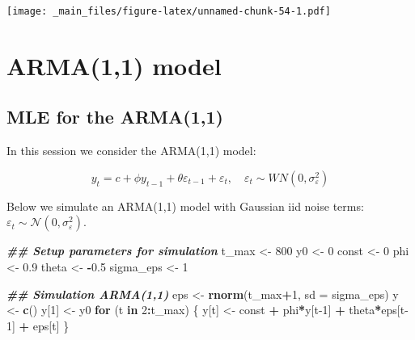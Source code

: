 \documentclass[
]{book}
\newenvironment{Shaded}{\begin{snugshade}}{\end{snugshade}}
\newcommand{\AttributeTok}[1]{\textcolor[rgb]{0.13,0.29,0.53}{#1}}
\newcommand{\ControlFlowTok}[1]{\textcolor[rgb]{0.13,0.29,0.53}{\textbf{#1}}}
\newcommand{\DecValTok}[1]{\textcolor[rgb]{0.00,0.00,0.81}{#1}}
\newcommand{\DocumentationTok}[1]{\textcolor[rgb]{0.56,0.35,0.01}{\textbf{\textit{#1}}}}
\newcommand{\FloatTok}[1]{\textcolor[rgb]{0.00,0.00,0.81}{#1}}
\newcommand{\FunctionTok}[1]{\textcolor[rgb]{0.13,0.29,0.53}{\textbf{#1}}}
\newcommand{\NormalTok}[1]{#1}
\newcommand{\OtherTok}[1]{\textcolor[rgb]{0.56,0.35,0.01}{#1}}
\newcommand{\SpecialCharTok}[1]{\textcolor[rgb]{0.81,0.36,0.00}{\textbf{#1}}}
\begin{document}
\texttt{[image: \_main\_files/figure-latex/unnamed-chunk-54-1.pdf]}

\hypertarget{session04}{%
\chapter{ARMA(1,1) model}\label{session04}}

\hypertarget{mle-for-the-arma11}{%
\section{MLE for the ARMA(1,1)}\label{mle-for-the-arma11}}

In this session we consider the ARMA(1,1) model:

\[
y_t = c + \phi y_{t-1} + \theta \varepsilon_{t-1} + \varepsilon_t, \quad \varepsilon_t \sim WN(0, \sigma^2_\varepsilon)
\]

Below we simulate an ARMA(1,1) model with Gaussian iid noise terms: \(\varepsilon_t \sim \mathcal{N}(0, \sigma^2_\varepsilon)\).

\begin{Shaded}
\begin{Highlighting}[]
\DocumentationTok{\#\# Setup parameters for simulation}
\NormalTok{t\_max }\OtherTok{\textless{}{-}} \DecValTok{800}
\NormalTok{y0    }\OtherTok{\textless{}{-}} \DecValTok{0}
\NormalTok{const }\OtherTok{\textless{}{-}} \DecValTok{0}
\NormalTok{phi   }\OtherTok{\textless{}{-}} \FloatTok{0.9}
\NormalTok{theta }\OtherTok{\textless{}{-}} \SpecialCharTok{{-}}\FloatTok{0.5}
\NormalTok{sigma\_eps }\OtherTok{\textless{}{-}} \DecValTok{1}

\DocumentationTok{\#\# Simulation ARMA(1,1)}
\NormalTok{eps }\OtherTok{\textless{}{-}} \FunctionTok{rnorm}\NormalTok{(t\_max}\SpecialCharTok{+}\DecValTok{1}\NormalTok{, }\AttributeTok{sd =}\NormalTok{ sigma\_eps)}
\NormalTok{y }\OtherTok{\textless{}{-}} \FunctionTok{c}\NormalTok{()}
\NormalTok{y[}\DecValTok{1}\NormalTok{] }\OtherTok{\textless{}{-}}\NormalTok{ y0}
\ControlFlowTok{for}\NormalTok{ (t }\ControlFlowTok{in} \DecValTok{2}\SpecialCharTok{:}\NormalTok{t\_max) \{}
\NormalTok{  y[t] }\OtherTok{\textless{}{-}}\NormalTok{ const }\SpecialCharTok{+}\NormalTok{ phi}\SpecialCharTok{*}\NormalTok{y[t}\DecValTok{{-}1}\NormalTok{] }\SpecialCharTok{+}\NormalTok{ theta}\SpecialCharTok{*}\NormalTok{eps[t}\DecValTok{{-}1}\NormalTok{] }\SpecialCharTok{+}\NormalTok{ eps[t]}
\NormalTok{\}}
\end{Highlighting}
\end{Shaded}
\end{document}
